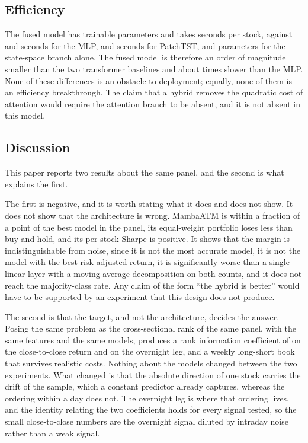 \documentclass[pdflatex,sn-mathphys-ay]{sn-jnl}
\theoremstyle{thmstyleone}%
\theoremstyle{thmstyletwo}%
\theoremstyle{thmstyletwo}%
\begin{document}
\subsection{Efficiency}\label{sec:efficiency}

The fused model
has \paramProposed{} trainable parameters and takes \secProposed{} seconds per stock, against
\paramMLP{} and \secMLP{} seconds for the MLP, \paramPatch{} and \secPatch{} seconds for PatchTST,
and \paramSSM{} parameters for the state-space branch alone. The fused model is therefore an order
of magnitude smaller than the two transformer baselines and about \secRatio{} times slower than the
MLP. None of these differences is an obstacle to deployment; equally, none of them is an efficiency
breakthrough. The claim that a hybrid removes the quadratic cost of attention would require the
attention branch to be absent, and it is not absent in this model.

\subsection{Discussion}\label{sec:discussion}

This paper reports two results about the same panel, and the second is what explains the first.

The first is negative, and it is worth stating what it does and does not show. It does not show that
the architecture is wrong. MambaATM is within a fraction of a point of the best model in the panel,
its equal-weight portfolio loses less than buy and hold, and its per-stock Sharpe is positive. It
shows that the margin is indistinguishable from noise, since it is not the most accurate model, it is
not the model with the best risk-adjusted return, it is significantly worse than a single linear layer
with a moving-average decomposition on both counts, and it does not reach the majority-class rate. Any
claim of the form ``the hybrid is better'' would have to be supported by an experiment that this
design does not produce.

The second is that the target, and not the architecture, decides the answer. Posing the same problem
as the cross-sectional rank of the same panel, with the same features and the same models, produces a
rank information coefficient of \icCcProp{} on the close-to-close return and \icOnProp{} on the
overnight leg, and a weekly long-short book that survives realistic costs. Nothing about the models
changed between the two experiments. What changed is that the absolute direction of one stock carries
the drift of the sample, which a constant predictor already captures, whereas the ordering within a
day does not. The overnight leg is where that ordering lives, and the identity relating the two
coefficients holds for every signal tested, so the small close-to-close numbers are the overnight
signal diluted by intraday noise rather than a weak signal.
\end{document}
